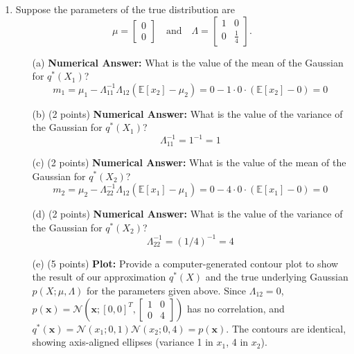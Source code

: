 \documentclass[a3paper,12pt]{extarticle} %
\begin{document}
\begin{enumerate}
    \item Suppose the parameters of the true distribution are 
    \[
    \mu = 
    \begin{bmatrix}
    0 \\
    0
    \end{bmatrix}
    \quad \text{and} \quad
    \Lambda = 
    \begin{bmatrix}
    1 & 0 \\
    0 & \frac{1}{4}
    \end{bmatrix}.
    \]
        \begin{enumerate}
            \item[(a)] \textbf{Numerical Answer:} What is the value of the mean of the Gaussian for \( q^*(X_1) \)?
\[
m_1 = \mu_1 - \Lambda_{11}^{-1} \Lambda_{12} (\mathbb{E}[x_2] - \mu_2) = 0 - 1 \cdot 0 \cdot (\mathbb{E}[x_2] - 0) = 0
\]
            \item[(b)] (2 points) \textbf{Numerical Answer:} What is the value of the variance of the Gaussian for \( q^*(X_1) \)?
\[
\Lambda_{11}^{-1} = 1^{-1} = 1
\]
            \item[(c)] (2 points) \textbf{Numerical Answer:} What is the value of the mean of the Gaussian for \( q^*(X_2) \)?
            \[
m_2 = \mu_2 - \Lambda_{22}^{-1} \Lambda_{12} (\mathbb{E}[x_1] - \mu_1) = 0 - 4 \cdot 0 \cdot (\mathbb{E}[x_1] - 0) = 0
\]
            \item[(d)] (2 points) \textbf{Numerical Answer:} What is the value of the variance of the Gaussian for \( q^*(X_2) \)?
\[
\Lambda_{22}^{-1} = (1/4)^{-1} = 4
\]
            \item[(e)] (5 points) \textbf{Plot:} Provide a computer-generated contour plot to show the result of our approximation \( q^*(X) \) and the true underlying Gaussian \( p(X; \mu, \Lambda) \) for the parameters given above.
            Since \(\Lambda_{12} = 0\), \(p(\mathbf{x}) = \mathcal{N}(\mathbf{x}; [0,0]^T, \begin{bmatrix} 1 & 0 \\ 0 & 4 \end{bmatrix})\) has no correlation, and \(q^*(\mathbf{x}) = \mathcal{N}(x_1; 0, 1) \mathcal{N}(x_2; 0, 4) = p(\mathbf{x})\). The contours are identical, showing axis-aligned ellipses (variance 1 in \(x_1\), 4 in \(x_2\)).


\end{enumerate}
\end{enumerate}
\end{document}
